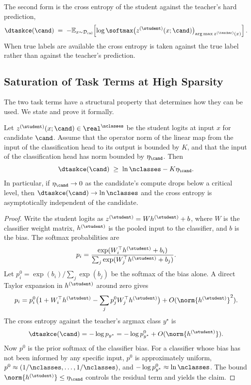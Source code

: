 The second form is the cross entropy of the student against the teacher's hard prediction,
\begin{equation}
\dtaskce(\cand) \;=\; - \mathbb{E}_{x \sim \mathcal{D}_{\mathrm{cal}}} \!\left[ \log \softmax\big(z^{(\student)}(x; \cand)\big)_{\arg\max z^{(\teacher)}(x)} \right].
\end{equation}
When true labels are available the cross entropy is taken against the true label rather than against the teacher's prediction.

\subsection{Saturation of Task Terms at High Sparsity}

The two task terms have a structural property that determines how they can be used. We state and prove it formally.

\begin{proposition}
\label{prop:saturation}
Let $z^{(\student)}(x; \cand) \in \real^{\nclasses}$ be the student logits at input $x$ for candidate $\cand$. Assume that the operator norm of the linear map from the input of the classification head to its output is bounded by $K$, and that the input of the classification head has norm bounded by $\eta_\cand$. Then
\[
\dtaskce(\cand) \;\ge\; \ln \nclasses - K \eta_\cand.
\]
In particular, if $\eta_\cand \to 0$ as the candidate's compute drops below a critical level, then $\dtaskce(\cand) \to \ln \nclasses$ and the cross entropy is asymptotically independent of the candidate.
\end{proposition}
\begin{proof}
Write the student logits as $z^{(\student)} = W h^{(\student)} + b$, where $W$ is the classifier weight matrix, $h^{(\student)}$ is the pooled input to the classifier, and $b$ is the bias. The softmax probabilities are
\[
p_i = \frac{\exp(W_i^\top h^{(\student)} + b_i)}{\sum_j \exp(W_j^\top h^{(\student)} + b_j)}.
\]
Let $p^0_i = \exp(b_i) / \sum_j \exp(b_j)$ be the softmax of the bias alone. A direct Taylor expansion in $h^{(\student)}$ around zero gives
\[
p_i = p^0_i \big(1 + W_i^\top h^{(\student)} - \sum_j p^0_j W_j^\top h^{(\student)}\big) + O(\norm{h^{(\student)}}^2).
\]
The cross entropy against the teacher's argmax class $y^\star$ is
\[
\dtaskce(\cand) = - \log p_{y^\star} = - \log p^0_{y^\star} + O(\norm{h^{(\student)}}).
\]
Now $p^0$ is the prior softmax of the classifier bias. For a classifier whose bias has not been informed by any specific input, $p^0$ is approximately uniform, $p^0 \approx (1/\nclasses, \ldots, 1/\nclasses)$, and $- \log p^0_{y^\star} \approx \ln \nclasses$. The bound $\norm{h^{(\student)}} \le \eta_\cand$ controls the residual term and yields the claim.
\end{proof}

